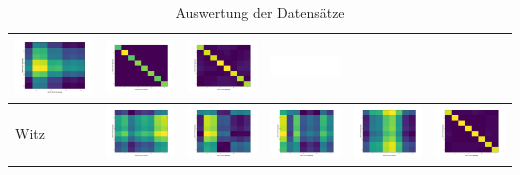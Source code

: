 \documentclass[12pt,german]{article}
\begin{document}
\begin{table}[H]
\begin{tabular}{| l | c | c | c | c | c |}
    \includegraphics[width=2.5cm]{../images/googleData/dictData.jpg} &
    \includegraphics[width=2.5cm]{../images/googleData/facebookData.jpg} &
    \includegraphics[width=2.5cm]{../images/googleData/googleData.jpg} &
    \includegraphics[width=2.5cm]{../images/googleData/witzData.jpg} \\
    \hline
    Witz &
    \includegraphics[width=2.5cm]{../images/witzData/abstractData.jpg} &
    \includegraphics[width=2.5cm]{../images/witzData/dictData.jpg} &
    \includegraphics[width=2.5cm]{../images/witzData/facebookData.jpg} &
    \includegraphics[width=2.5cm]{../images/witzData/googleData.jpg} &
    \includegraphics[width=2.5cm]{../images/witzData/witzData.jpg} \\
    \hline
  \end{tabular}
  \caption{Auswertung der Datensätze}
  \label{tab:datenAuswertungText}
\end{table}
\end{document}
